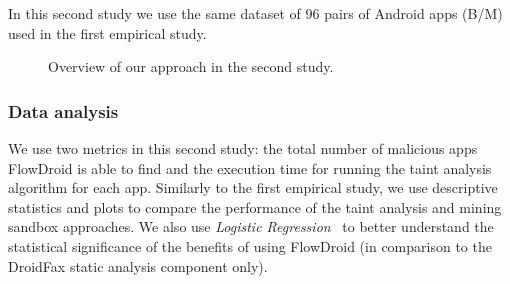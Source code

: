 In this second study we use the same dataset of $96$ pairs of Android apps (B/M) used in the first empirical
study.


\begin{figure}
  \caption{Overview of our approach in the second study.}
  \label{fig:settings2}
\end{figure}


\subsubsection{Data analysis}


We use two metrics in this second study:
the total number of malicious apps FlowDroid is able to
find and the execution time for running the taint analysis algorithm
for each app. Similarly to the first empirical study,
we use descriptive statistics
and plots to compare the performance of the taint analysis and
mining sandbox approaches. We also use \emph{Logistic Regression}~\cite[Chapter~4]{statistical-learning}
to better understand the statistical
significance of the benefits of using FlowDroid
(in comparison to the DroidFax static analysis
component only). 











